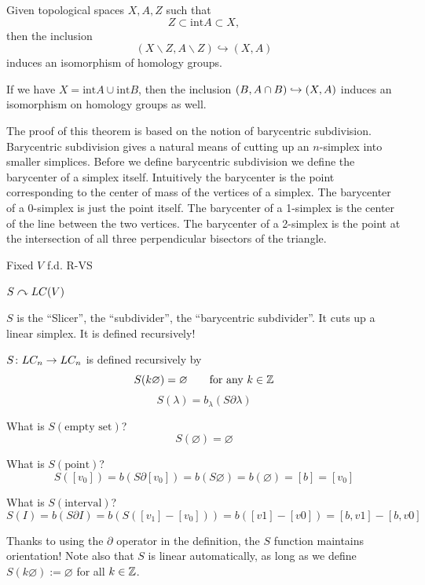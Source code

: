 \documentclass[11pt,leqno,oneside]{amsart}
\newenvironment{dateenv}{
  \vspace{1em}
}{
  \vspace{1em}
}
\newcommand{\mydate}[4]{
  \newdate{#1}{#2}{#3}{#4}
  \begin{dateenv}
    \hfill\displaydate{#1}
  \end{dateenv}
}
\numberwithin{thm}{section}
\renewcommand{\setminus}{\smallsetminus}
\renewcommand{\null}{\varnothing}
\renewcommand{\d}{\partial}
\begin{document}
\begin{thm}[Excision]

  Given topological spaces \(X,A,Z\) such that
  \[Z \subset \text{int}{A} \subset X,\]
  then the inclusion
  \[(X \setminus Z,A \setminus Z) \hookrightarrow (X,A) \]
  induces an isomorphism of homology groups.
\end{thm}

If we have \(X=\text{int} A \cup \text{int} B\), then the inclusion \((B, A \cap B) \hookrightarrow (X,A)\) induces an isomorphism on homology groups as well.

The proof of this theorem is based on the notion of barycentric subdivision. Barycentric subdivision gives a natural means of cutting up an \(n\)-simplex into smaller simplices. Before we define barycentric subdivision we define the barycenter of a simplex itself. Intuitively the barycenter is the point corresponding to the center of mass of the vertices of a simplex. The barycenter of a 0-simplex is just the point itself. The barycenter of a 1-simplex is the center of the line between the two vertices. The barycenter of a 2-simplex is the point at the intersection of all three perpendicular bisectors of the triangle.

\mydate{d22}{24}{3}{2017}

Fixed $V$ f.d. R-VS

$S \curvearrowright LC(V)$

$S$ is the ``Slicer'', the ``subdivider'', the ``barycentric subdivider''.  It cuts up a linear simplex.  It is defined recursively!

\begin{defn}
  $S \colon LC_n \to LC_n$ is defined recursively by
  $$S(k\null) = \null \qquad\text{for any $k \in \Z$}$$
  $$S(\lambda) = b_\lambda(S \d \lambda)$$
\end{defn}
\begin{example}
  What is $S(\text{empty set})$?
  $$S(\null) = \null$$
\end{example}
\begin{example}
  What is $S(\text{point})$?
  $$S([v_0]) = b(S \d [v_0]) = b(S \null) = b(\null) = [b] = [v_0]$$
\end{example}
\begin{example}
  What is $S(\text{interval})$?
  $$S(I) = b(S \d I) = b(S ([v_1] - [v_0])) = b([v1] - [v0]) = [b,v1] - [b,v0]$$
\end{example}

Thanks to using the $\d$ operator in the definition, the $S$ function maintains orientation!  Note also that $S$ is linear automatically, as long as we define $S(k\null) := \null$ for all $k \in {\mathbb Z}$.
\end{document}
